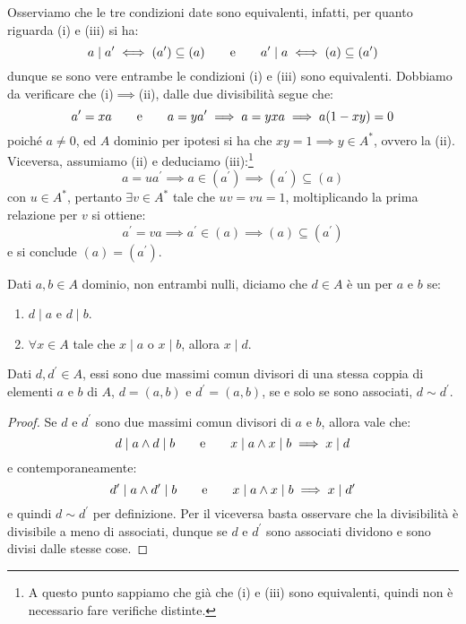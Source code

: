 \documentclass[11pt]{scrartcl}
\begin{document}
\begin{remark}
    Osserviamo che le tre condizioni date sono equivalenti, infatti, per quanto riguarda (i) e (iii) si ha:
    \[ a \mid a^{\prime} \iff (a^{\prime}) \subseteq (a) \qquad \text e \qquad a^{\prime}\mid a \iff (a) \subseteq (a^{\prime})
        \]
    dunque se sono vere entrambe le condizioni (i) e (iii) sono equivalenti. Dobbiamo da verificare che (i)$\implies$(ii), dalle due divisibilità segue che:
    \[ a^{\prime} = xa \qquad \text e \qquad a = y a^{\prime} \implies a = yxa \implies a(1-xy) = 0
        \]
    poiché $a \ne 0$, ed $A$ dominio per ipotesi si ha che $xy = 1 \implies y \in A^*$, ovvero la (ii). Viceversa, assumiamo (ii) e deduciamo 
    (iii):\footnote{A questo punto sappiamo che già che (i) e (iii) sono equivalenti, quindi non è necessario fare verifiche distinte.}
    \[ a = ua^{\prime} \implies a \in (a^{\prime}) \implies (a^{\prime}) \subseteq (a)
        \]
    con $u \in A^*$, pertanto $\exists v \in A^*$ tale che $uv = vu = 1$, moltiplicando la prima relazione per $v$ si ottiene:
    \[ a^{\prime} = va \implies a^{\prime} \in (a) \implies (a) \subseteq (a^{\prime})
        \]
    e si conclude $(a) = (a^{\prime})$.
\end{remark}

\begin{definition}
    Dati $a,b \in A$ dominio, non entrambi nulli, diciamo che $d \in A$ è un  per $a$ e $b$ se:
    \begin{enumerate}[(1)]
        \item $d \mid a$ e $d \mid b$.
        \item $\forall x \in A$ tale che $x \mid a$ o $x\mid b$, allora $x \mid d$.
    \end{enumerate}
\end{definition}

\begin{proposition}
    Dati $d,d^{\prime} \in A$, essi sono due massimi comun divisori di una stessa coppia di elementi $a$ e $b$ di $A$, $d=(a,b)$ e $d^{\prime} = (a,b)$, se e solo se sono associati, $d \sim d^{\prime}$.
\end{proposition}

\begin{proof}
Se $d$ e $d^{\prime}$ sono due massimi comun divisori di $a$ e $b$, allora vale che:
        \[ d \mid a \land d \mid b
        \qquad
        \text e
        \qquad
        x \mid a \land x \mid b \implies x \mid d
            \]
    e contemporaneamente:
        \[ d^{\prime} \mid a \land d^{\prime} \mid b
        \qquad
        \text e
        \qquad
        x \mid a \land x \mid b \implies x \mid d^{\prime}
            \]
    e quindi $d \sim d^{\prime}$ per definizione. Per il viceversa basta osservare che la divisibilità è divisibile a meno di associati, dunque se $d$ e $d^{\prime}$ sono associati dividono e sono divisi dalle stesse cose.
\end{proof}
\end{document}
